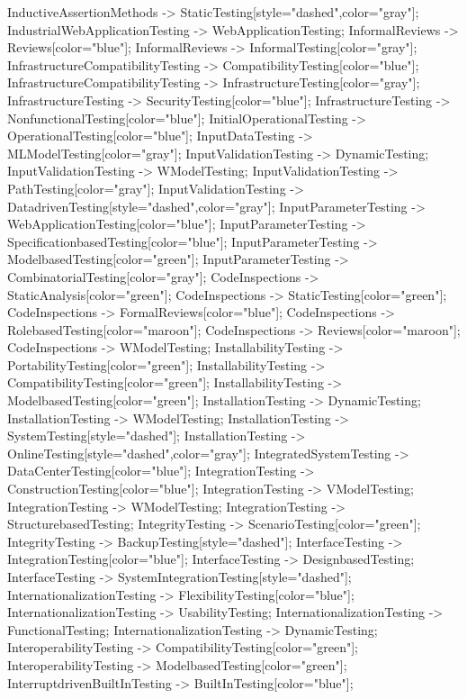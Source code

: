 \documentclass{article}
\begin{document}
{InductiveAssertionMethods -> StaticTesting[style="dashed",color="gray"];
IndustrialWebApplicationTesting -> WebApplicationTesting;
InformalReviews -> Reviews[color="blue"];
InformalReviews -> InformalTesting[color="gray"];
InfrastructureCompatibilityTesting -> CompatibilityTesting[color="blue"];
InfrastructureCompatibilityTesting -> InfrastructureTesting[color="gray"];
InfrastructureTesting -> SecurityTesting[color="blue"];
InfrastructureTesting -> NonfunctionalTesting[color="blue"];
InitialOperationalTesting -> OperationalTesting[color="blue"];
InputDataTesting -> MLModelTesting[color="gray"];
InputValidationTesting -> DynamicTesting;
InputValidationTesting -> WModelTesting;
InputValidationTesting -> PathTesting[color="gray"];
InputValidationTesting -> DatadrivenTesting[style="dashed",color="gray"];
InputParameterTesting -> WebApplicationTesting[color="blue"];
InputParameterTesting -> SpecificationbasedTesting[color="blue"];
InputParameterTesting -> ModelbasedTesting[color="green"];
InputParameterTesting -> CombinatorialTesting[color="gray"];
CodeInspections -> StaticAnalysis[color="green"];
CodeInspections -> StaticTesting[color="green"];
CodeInspections -> FormalReviews[color="blue"];
CodeInspections -> RolebasedTesting[color="maroon"];
CodeInspections -> Reviews[color="maroon"];
CodeInspections -> WModelTesting;
InstallabilityTesting -> PortabilityTesting[color="green"];
InstallabilityTesting -> CompatibilityTesting[color="green"];
InstallabilityTesting -> ModelbasedTesting[color="green"];
InstallationTesting -> DynamicTesting;
InstallationTesting -> WModelTesting;
InstallationTesting -> SystemTesting[style="dashed"];
InstallationTesting -> OnlineTesting[style="dashed",color="gray"];
IntegratedSystemTesting -> DataCenterTesting[color="blue"];
IntegrationTesting -> ConstructionTesting[color="blue"];
IntegrationTesting -> VModelTesting;
IntegrationTesting -> WModelTesting;
IntegrationTesting -> StructurebasedTesting;
IntegrityTesting -> ScenarioTesting[color="green"];
IntegrityTesting -> BackupTesting[style="dashed"];
InterfaceTesting -> IntegrationTesting[color="blue"];
InterfaceTesting -> DesignbasedTesting;
InterfaceTesting -> SystemIntegrationTesting[style="dashed"];
InternationalizationTesting -> FlexibilityTesting[color="blue"];
InternationalizationTesting -> UsabilityTesting;
InternationalizationTesting -> FunctionalTesting;
InternationalizationTesting -> DynamicTesting;
InteroperabilityTesting -> CompatibilityTesting[color="green"];
InteroperabilityTesting -> ModelbasedTesting[color="green"];
InterruptdrivenBuiltInTesting -> BuiltInTesting[color="blue"];
}
\end{document}
